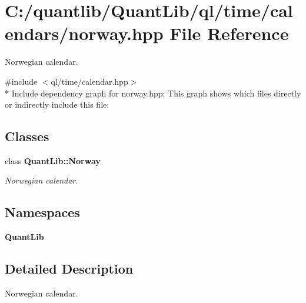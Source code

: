 \section{C\+:/quantlib/\+Quant\+Lib/ql/time/calendars/norway.hpp File Reference}
\label{norway_8hpp}


Norwegian calendar.  


{\ttfamily \#include $<$ql/time/calendar.\+hpp$>$}\\*
Include dependency graph for norway.\+hpp\+:
This graph shows which files directly or indirectly include this file\+:
\subsection*{Classes}
\begin{DoxyCompactItemize}
\item 
class {\bf Quant\+Lib\+::\+Norway}
\begin{DoxyCompactList}\small\item\em Norwegian calendar. \end{DoxyCompactList}\end{DoxyCompactItemize}
\subsection*{Namespaces}
\begin{DoxyCompactItemize}
\item 
 {\bf Quant\+Lib}
\end{DoxyCompactItemize}


\subsection{Detailed Description}
Norwegian calendar. 

